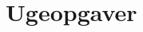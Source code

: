 \appendix
\appendixpage
\addappheadtotoc

\label{appendix}

\section{Ugeopgaver}
\label{sec:ugeopgaver}

